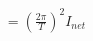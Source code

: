 \documentclass[preview]{standalone}
\begin{document}
\begin{align*}
=  (\frac{2\pi}{T})^2I_{net}
\end{align*}
\end{document}
